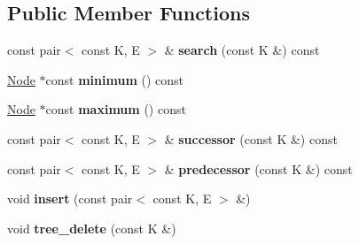 \subsection*{Public Member Functions}
\begin{DoxyCompactItemize}
\item 
\mbox{\label{classRedBlackTree_a22a9b5fe5f5792160163fc68d3a72364}} 
const pair$<$ const K, E $>$ \& {\bfseries search} (const K \&) const
\item 
\mbox{\label{classRedBlackTree_aa57aaacc1bb547efd1eeea3449de57c3}} 
\hyperlink{structRBTreeNode}{Node} $\ast$const {\bfseries minimum} () const
\item 
\mbox{\label{classRedBlackTree_a108f44497081568d03f7533a5ba8dbb3}} 
\hyperlink{structRBTreeNode}{Node} $\ast$const {\bfseries maximum} () const
\item 
\mbox{\label{classRedBlackTree_ab81e72ce029c6e240960c259bd070d6a}} 
const pair$<$ const K, E $>$ \& {\bfseries successor} (const K \&) const
\item 
\mbox{\label{classRedBlackTree_a279825b0f6c710e4e7797b5987d4d948}} 
const pair$<$ const K, E $>$ \& {\bfseries predecessor} (const K \&) const
\item 
\mbox{\label{classRedBlackTree_a87d6a25ba6d6b77344870b8fd50765d3}} 
void {\bfseries insert} (const pair$<$ const K, E $>$ \&)
\item 
\mbox{\label{classRedBlackTree_a926cd4e9c05210789e03663dd5148a9b}} 
void {\bfseries tree\+\_\+delete} (const K \&)
\end{DoxyCompactItemize}

